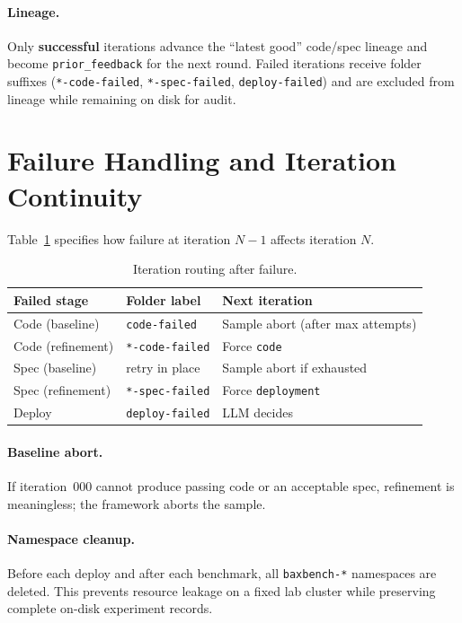 \paragraph{Lineage.}
Only \textbf{successful} iterations advance the ``latest good'' code/spec
lineage and become \texttt{prior\_feedback} for the next round.  Failed
iterations receive folder suffixes (\texttt{*-code-failed},
\texttt{*-spec-failed}, \texttt{deploy-failed}) and are excluded from lineage
while remaining on disk for audit.


\section{Failure Handling and Iteration Continuity}
\label{sec:methods-failure}

Table~\ref{tab:failure-routing} specifies how failure at iteration $N{-}1$
affects iteration $N$.

\begin{table}[t]
  \centering
  \caption{Iteration routing after failure.}
  \label{tab:failure-routing}
  \small
  \begin{tabular}{@{}lll@{}}
    \toprule
    \textbf{Failed stage} & \textbf{Folder label} & \textbf{Next iteration} \\
    \midrule
    Code (baseline) & \texttt{code-failed} & Sample abort (after max attempts) \\
    Code (refinement) & \texttt{*-code-failed} & Force \texttt{code} \\
    Spec (baseline) & retry in place & Sample abort if exhausted \\
    Spec (refinement) & \texttt{*-spec-failed} & Force \texttt{deployment} \\
    Deploy & \texttt{deploy-failed} & LLM decides \\
  \end{tabular}
\end{table}

\paragraph{Baseline abort.}
If iteration~000 cannot produce passing code or an acceptable spec, refinement
is meaningless; the framework aborts the sample.

\paragraph{Namespace cleanup.}
Before each deploy and after each benchmark, all \texttt{baxbench-*} namespaces
are deleted.  This prevents resource leakage on a fixed lab cluster while
preserving complete on-disk experiment records.


